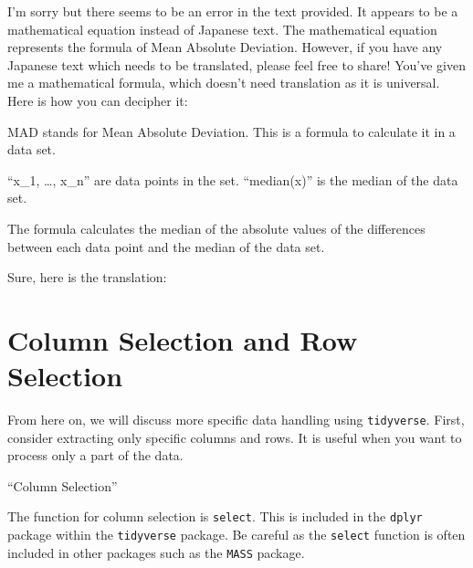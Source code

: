 \documentclass[
  a4paper,
]{book}
\begin{document}
I'm sorry but there seems to be an error in the text provided. It
appears to be a mathematical equation instead of Japanese text. The
mathematical equation represents the formula of Mean Absolute Deviation.
However, if you have any Japanese text which needs to be translated,
please feel free to share! You've given me a mathematical formula, which
doesn't need translation as it is universal. Here is how you can
decipher it:

MAD stands for Mean Absolute Deviation. This is a formula to calculate
it in a data set.

``x\_1, \ldots, x\_n'' are data points in the set. ``median(x)'' is the
median of the data set.

The formula calculates the median of the absolute values of the
differences between each data point and the median of the data set.

Sure, here is the translation:

\section{Column Selection and Row
Selection}\label{column-selection-and-row-selection}

From here on, we will discuss more specific data handling using
\texttt{tidyverse}. First, consider extracting only specific columns and
rows. It is useful when you want to process only a part of the data.

``Column Selection''

The function for column selection is \texttt{select}. This is included
in the \texttt{dplyr} package within the \texttt{tidyverse} package. Be
careful as the \texttt{select} function is often included in other
packages such as the \texttt{MASS} package.
\end{document}
